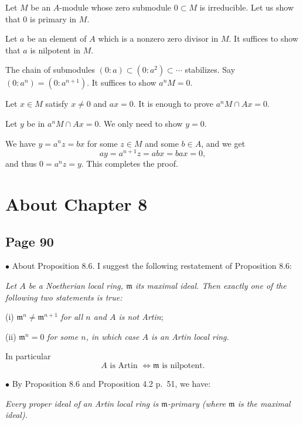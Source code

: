 \documentclass[parskip=half,fontsize=12pt]{scrartcl}%
\newcommand{\mf}{\mathfrak}
\newcommand{\bu}{\bullet}
\begin{document}
Let $M$ be an $A$-module whose zero submodule $0\subset M$ is irreducible. Let us show that $0$ is primary in $M$. 

Let $a$ be an element of $A$ which is a nonzero zero divisor in $M$. It suffices to show that $a$ is nilpotent in $M$. 

The chain of submodules $(0:a)\subset(0:a^2)\subset\cdots$ stabilizes. Say $(0:a^n)=(0:a^{n+1})$. It suffices to show $a^nM=0$. 

Let $x\in M$ satisfy $x\ne0$ and $ax=0$. It is enough to prove $a^nM\cap Ax=0$. 

Let $y$ be in $a^nM\cap Ax=0$. We only need to show $y=0$. 

We have $y=a^nz=bx$ for some $z\in M$ and some $b\in A$, and we get 
$$
ay=a^{n+1}z=abx=bax=0,
$$ 
and thus $0=a^nz=y$. This completes the proof.%

\section{About Chapter 8}%

\subsection{Page 90}\label{90}%

$\bu$ About Proposition 8.6. I suggest the following restatement of Proposition 8.6:

\emph{Let $A$ be a Noetherian local ring, $\mf m$ its maximal ideal. Then exactly one of the following two statements is true:}

(i) $\mf m^n\ne\mf m^{n+1}$ \emph{for all $n$ and $A$ is \emph{not} Artin};

(ii) $\mf m^n=0$ \emph{for some $n$, in which case $A$ is an Artin local ring.}

In particular 
\begin{equation}\label{86}
A\text{ is Artin $\iff\mf m$ is nilpotent.}
\end{equation}%

$\bu$ By Proposition 8.6 and Proposition 4.2 p.~51, we have:

\emph{Every proper ideal of an Artin local ring is $\mf m$-primary (where $\mf m$ is the maximal ideal).} 
\end{document}
